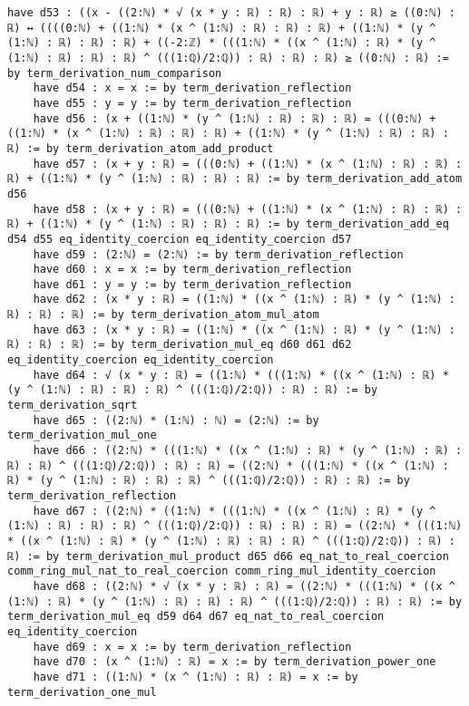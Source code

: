 \documentclass{article}
\begin{document}
\begin{tcolorbox}[colback=white!10, width=\linewidth]
\begin{lstlisting}[language=Lean4]
    have d53 : ((x - ((2:ℕ) * √ (x * y : ℝ) : ℝ) : ℝ) + y : ℝ) ≥ ((0:ℕ) : ℝ) ↔ ((((0:ℕ) + ((1:ℕ) * (x ^ (1:ℕ) : ℝ) : ℝ) : ℝ) + ((1:ℕ) * (y ^ (1:ℕ) : ℝ) : ℝ) : ℝ) + ((-2:ℤ) * (((1:ℕ) * ((x ^ (1:ℕ) : ℝ) * (y ^ (1:ℕ) : ℝ) : ℝ) : ℝ) ^ (((1:ℚ)/2:ℚ)) : ℝ) : ℝ) : ℝ) ≥ ((0:ℕ) : ℝ) := by term_derivation_num_comparison
    have d54 : x = x := by term_derivation_reflection
    have d55 : y = y := by term_derivation_reflection
    have d56 : (x + ((1:ℕ) * (y ^ (1:ℕ) : ℝ) : ℝ) : ℝ) = (((0:ℕ) + ((1:ℕ) * (x ^ (1:ℕ) : ℝ) : ℝ) : ℝ) + ((1:ℕ) * (y ^ (1:ℕ) : ℝ) : ℝ) : ℝ) := by term_derivation_atom_add_product
    have d57 : (x + y : ℝ) = (((0:ℕ) + ((1:ℕ) * (x ^ (1:ℕ) : ℝ) : ℝ) : ℝ) + ((1:ℕ) * (y ^ (1:ℕ) : ℝ) : ℝ) : ℝ) := by term_derivation_add_atom d56
    have d58 : (x + y : ℝ) = (((0:ℕ) + ((1:ℕ) * (x ^ (1:ℕ) : ℝ) : ℝ) : ℝ) + ((1:ℕ) * (y ^ (1:ℕ) : ℝ) : ℝ) : ℝ) := by term_derivation_add_eq d54 d55 eq_identity_coercion eq_identity_coercion d57
    have d59 : (2:ℕ) = (2:ℕ) := by term_derivation_reflection
    have d60 : x = x := by term_derivation_reflection
    have d61 : y = y := by term_derivation_reflection
    have d62 : (x * y : ℝ) = ((1:ℕ) * ((x ^ (1:ℕ) : ℝ) * (y ^ (1:ℕ) : ℝ) : ℝ) : ℝ) := by term_derivation_atom_mul_atom
    have d63 : (x * y : ℝ) = ((1:ℕ) * ((x ^ (1:ℕ) : ℝ) * (y ^ (1:ℕ) : ℝ) : ℝ) : ℝ) := by term_derivation_mul_eq d60 d61 d62 eq_identity_coercion eq_identity_coercion
    have d64 : √ (x * y : ℝ) = ((1:ℕ) * (((1:ℕ) * ((x ^ (1:ℕ) : ℝ) * (y ^ (1:ℕ) : ℝ) : ℝ) : ℝ) ^ (((1:ℚ)/2:ℚ)) : ℝ) : ℝ) := by term_derivation_sqrt
    have d65 : ((2:ℕ) * (1:ℕ) : ℕ) = (2:ℕ) := by term_derivation_mul_one
    have d66 : ((2:ℕ) * (((1:ℕ) * ((x ^ (1:ℕ) : ℝ) * (y ^ (1:ℕ) : ℝ) : ℝ) : ℝ) ^ (((1:ℚ)/2:ℚ)) : ℝ) : ℝ) = ((2:ℕ) * (((1:ℕ) * ((x ^ (1:ℕ) : ℝ) * (y ^ (1:ℕ) : ℝ) : ℝ) : ℝ) ^ (((1:ℚ)/2:ℚ)) : ℝ) : ℝ) := by term_derivation_reflection
    have d67 : ((2:ℕ) * ((1:ℕ) * (((1:ℕ) * ((x ^ (1:ℕ) : ℝ) * (y ^ (1:ℕ) : ℝ) : ℝ) : ℝ) ^ (((1:ℚ)/2:ℚ)) : ℝ) : ℝ) : ℝ) = ((2:ℕ) * (((1:ℕ) * ((x ^ (1:ℕ) : ℝ) * (y ^ (1:ℕ) : ℝ) : ℝ) : ℝ) ^ (((1:ℚ)/2:ℚ)) : ℝ) : ℝ) := by term_derivation_mul_product d65 d66 eq_nat_to_real_coercion comm_ring_mul_nat_to_real_coercion comm_ring_mul_identity_coercion
    have d68 : ((2:ℕ) * √ (x * y : ℝ) : ℝ) = ((2:ℕ) * (((1:ℕ) * ((x ^ (1:ℕ) : ℝ) * (y ^ (1:ℕ) : ℝ) : ℝ) : ℝ) ^ (((1:ℚ)/2:ℚ)) : ℝ) : ℝ) := by term_derivation_mul_eq d59 d64 d67 eq_nat_to_real_coercion eq_identity_coercion
    have d69 : x = x := by term_derivation_reflection
    have d70 : (x ^ (1:ℕ) : ℝ) = x := by term_derivation_power_one
    have d71 : ((1:ℕ) * (x ^ (1:ℕ) : ℝ) : ℝ) = x := by term_derivation_one_mul

\end{lstlisting}
\end{tcolorbox}
\end{document}

